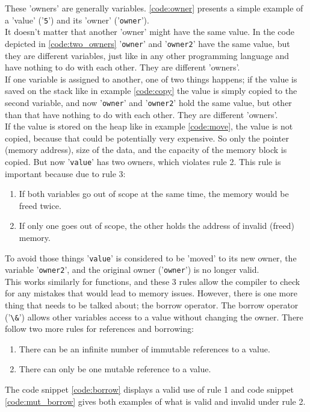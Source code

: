 These 'owners' are generally variables. \ref{code:owner} presents a simple example of a 'value' ('\lstinline{5}') and its
'owner' ('\lstinline{owner}').\\
It doesn't matter that another 'owner' might have the same value. In the code depicted in \ref{code:two_owners}
'\lstinline{owner}' and '\lstinline{owner2}' have the same value, but they are different variables, just like in any
other programming language and have nothing to do with each other. They are different 'owners'.\\
If one variable is assigned to another, one of two things happens; if the value is saved on the stack like in
example \ref{code:copy} the value is simply copied to the second variable, and now '\lstinline{owner}' and '\lstinline{owner2}'
hold the same value, but other than that have nothing to do with each other. They are different 'owners'.\\
If the value is stored on the heap like in example \ref{code:move}, the value is not copied, because that could
be potentially very expensive.
So only the pointer (memory address), size of the data, and the capacity of the memory block is copied.
But now '\lstinline{value}' has two owners, which violates rule 2.
This rule is important because due to rule 3:
\begin{enumerate}
    \item If both variables go out of scope at the same time, the memory would be freed twice.
    \item If only one goes out of scope, the other holds the address of invalid (freed) memory.
\end{enumerate}
To avoid those things '\lstinline{value}' is considered to be 'moved' to its new owner, the variable '\lstinline{owner2}',
and the original owner ('\lstinline{owner}') is no longer valid.\\
This works similarly for functions, and these 3 rules allow the compiler to check for any mistakes that would lead to
memory issues.
However, there is one more thing that needs to be talked about; the borrow operator.
The borrow operator ('\lstinline{\&}') \cite{rust_borrow} allows other variables access to a value without changing the owner.
There follow two more rules for references and borrowing:
\begin{enumerate}
    \item There can be an infinite number of immutable references to a value.
    \item There can only be one mutable reference to a value.
\end{enumerate}
The code snippet \ref{code:borrow} displays a valid use of rule 1 and code snippet \ref{code:mut_borrow} gives both examples
of what is valid and invalid under rule 2.

